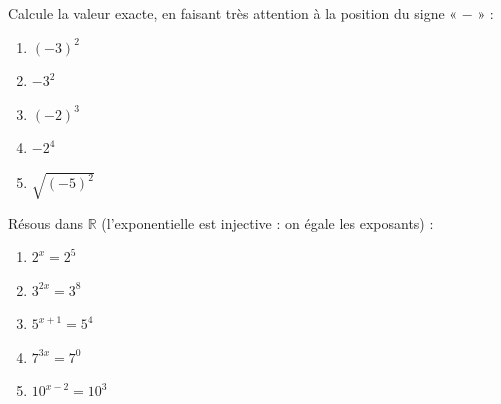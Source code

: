 \documentclass[11pt,a4paper]{article}
\newcommand{\R}{\mathbb{R}}
\begin{document}
\begin{exo}
Calcule la valeur exacte, en faisant très attention à la position du signe « $-$ » :
\begin{enumerate}[label=\alph*),leftmargin=2em,topsep=1pt,itemsep=1pt]
  \item $(-3)^{2}$ \qquad
  \item $-3^{2}$ \qquad
  \item $(-2)^{3}$ \qquad
  \item $-2^{4}$ \qquad
  \item $\sqrt{(-5)^{2}}$
\end{enumerate}
\end{exo}

\begin{exo}
Résous dans $\R$ (l'exponentielle est injective : on égale les exposants) :
\begin{enumerate}[label=\alph*),leftmargin=2em,topsep=1pt,itemsep=1pt]
  \item $2^{x}=2^{5}$ \qquad
  \item $3^{2x}=3^{8}$ \qquad
  \item $5^{x+1}=5^{4}$ \qquad
  \item $7^{3x}=7^{0}$ \qquad
  \item $10^{x-2}=10^{3}$
\end{enumerate}
\end{exo}
\end{document}

